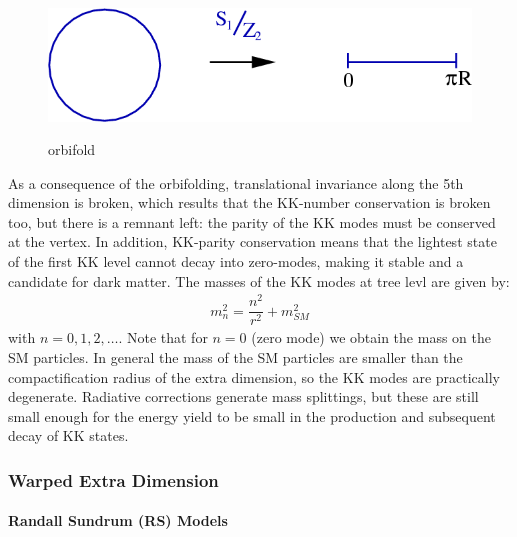 \begin{figure}[H]
  \centering
\includegraphics[width=12cm]{SM_chapter_plots/orbifold}
\label{orbifigure}\caption{orbifold}
\end{figure}

As a consequence of the orbifolding, translational invariance along the 5th dimension is broken, which results that the KK-number conservation is broken too, but there is a remnant left: the parity
of the KK modes must be conserved at	 the vertex. In addition, KK-parity conservation means that the lightest state of
the first KK level cannot decay into zero-modes, making it
stable and a candidate for dark matter.
The masses of the KK modes at tree levl are given by:
\begin{eqnarray}
m_{n}^{2} = \dfrac{n^{2}}{r^{2}}+ m_{SM}^{2}
\end{eqnarray}
with $n=0,1,2,\dots$. Note that for $n=0$ (zero mode) we obtain the mass on the SM particles. In general the mass of the SM particles are smaller than the compactification radius of the extra dimension, so the KK modes are practically degenerate. Radiative corrections generate mass splittings, but these are still
small enough for the energy yield to be small in the production and subsequent decay of KK states.

\subsubsection{Warped Extra Dimension}

\paragraph{Randall Sundrum (RS) Models}

